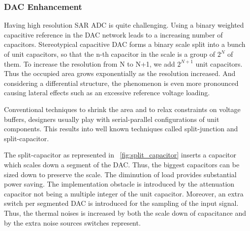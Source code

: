 \subsubsection{DAC Enhancement}	
Having high resolution SAR ADC is quite challenging. Using a binary weighted capacitive reference in the DAC network leads to a increasing number of capacitors. Stereotypical capacitive DAC forms a binary scale split into a bunch of unit capacitors, so that the n-th capacitor in the scale is a group of \(2^N\) of them. To increase the resolution from N to N+1, we add \(2^{N+1}\) unit capacitors. Thus the occupied area grows exponentially as the resolution increased. And considering a differential structure, the phenomenon is even more pronounced causing lateral effects such as an excessive reference voltage loading.

Conventional techniques to shrink the area and to relax constraints on voltage buffers, designers usually play with serial-parallel configurations of unit components. This results into well known techniques called split-junction and split-capacitor. 

The split-capacitor as represented in \figurename~\ref{fig:split_capacitor} inserts a capacitor which scales down a segment of the DAC\@. Thus, the biggest capacitors can be sized down to preserve the scale. The diminution of load provides substantial power saving. The implementation obstacle is introduced by the attenuation capacitor not being a multiple integer of the unit capacitor. Moreover, an extra switch per segmented DAC is introduced for the sampling of the input signal. Thus, the thermal noises is increased by both the scale down of capacitance and by the extra noise sources switches represent.

